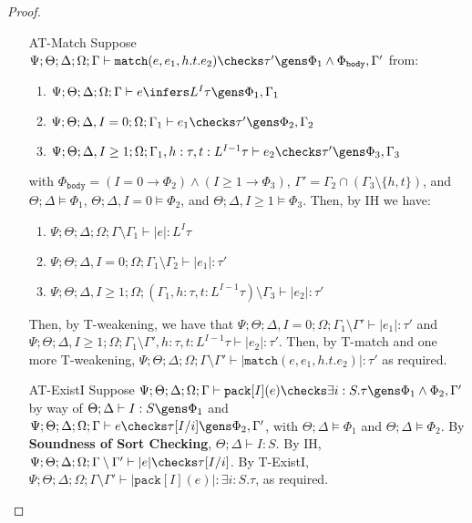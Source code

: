 \begin{proof}
\begin{enumerate}
  \item[AT-Match] Suppose $\Psi ; \Theta ; \Delta ; \Omega ; \Gamma\vdash \texttt{match}(e,e_1,h.t.e_2) \checks \tau' \gens \Phi_1 \wedge \Phi_\texttt{body}, \Gamma'$ from:
  \begin{enumerate}
    \item $\Psi ; \Theta ; \Delta ; \Omega ; \Gamma\vdash e \infers L^I \tau \gens \Phi_1, \Gamma_1$
    \item $\Psi ; \Theta ; \Delta, I = 0 ; \Omega ; \Gamma_1\vdash e_1 \checks \tau' \gens \Phi_2,\Gamma_2$
    \item $\Psi ; \Theta ; \Delta, I \geq 1; \Omega ; \Gamma_1, h : \tau, t : L^{I-1} \tau \vdash e_2 \checks \tau' \gens \Phi_3,\Gamma_3$
  \end{enumerate}
  with $\Phi_\texttt{body} = (I = 0 \to \Phi_2) \wedge (I \geq 1 \to \Phi_3 )$, $\Gamma' = \Gamma_2 \cap (\Gamma_3 \setminus \{h,t\})$, and $\Theta ; \Delta \vDash \Phi_1$, $\Theta ; \Delta, I = 0 \vDash \Phi_2$, and $\Theta ; \Delta, I \geq 1 \vDash \Phi_3$. Then, by IH we have:
  \begin{enumerate}
    \item $\Psi ; \Theta ; \Delta ; \Omega ; \Gamma \setminus \Gamma_1 \vdash |e| : L^I \tau$
    \item $\Psi ; \Theta ; \Delta, I = 0 ; \Omega ; \Gamma_1 \setminus \Gamma_2 \vdash |e_1| : \tau'$
    \item $\Psi ; \Theta ; \Delta, I \geq 1; \Omega ; (\Gamma_1, h : \tau, t : L^{I-1} \tau) \setminus \Gamma_3 \vdash |e_2| : \tau'$
  \end{enumerate}
  Then, by T-weakening, we have that $\Psi ; \Theta ; \Delta, I = 0 ; \Omega ; \Gamma_1 \setminus \Gamma' \vdash |e_1| : \tau'$ and $\Psi ; \Theta ; \Delta, I \geq 1; \Omega ; \Gamma_1 \setminus \Gamma', h : \tau, t : L^{I-1} \tau \vdash |e_2| : \tau'$. Then, by T-match and one more T-weakening,
  $\Psi ; \Theta ; \Delta ; \Omega ; \Gamma \setminus \Gamma' \vdash |\texttt{match}(e,e_1,h.t.e_2)| : \tau'$ as required.
  
  \item[AT-ExistI] Suppose $\Psi ; \Theta ; \Delta ; \Omega ; \Gamma\vdash \texttt{pack}[I](e) \checks \exists i:S.\tau \gens \Phi_1 \wedge \Phi_2, \Gamma'$ by way of $\Theta ; \Delta \vdash I : S \gens \Phi_1$ and $\Psi ; \Theta ; \Delta ; \Omega ; \Gamma\vdash e \checks \tau[I/i] \gens \Phi_2,\Gamma'$, with $\Theta ; \Delta \vDash \Phi_1$ and $\Theta ; \Delta \vDash \Phi_2$. By \textbf{Soundness of Sort Checking},  $\Theta ; \Delta \vdash I : S$. By IH, $\Psi ; \Theta ; \Delta ; \Omega ; \Gamma\setminus \Gamma' \vdash |e| \checks \tau[I/i]$. By T-ExistI, $\Psi ; \Theta ; \Delta ; \Omega ; \Gamma \setminus \Gamma'\vdash |\texttt{pack}[I](e)| : \exists i:S.\tau$, as required.


\end{enumerate}
\end{proof}
